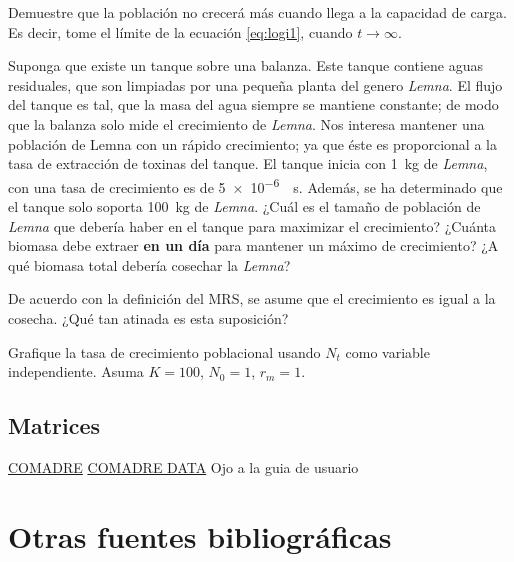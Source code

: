 \documentclass[12pt,letterpaper,]{book}
\let\BeginKnitrBlock\begin \let\EndKnitrBlock\end
\begin{document}
\BeginKnitrBlock{exercise}
\protect\hypertarget{exr:logGrowth2}{}{\label{exr:logGrowth2} }Demuestre que
la población no crecerá más cuando llega a la capacidad de carga. Es
decir, tome el límite de la ecuación \eqref{eq:logi1}, cuando
\(t \to \infty\).
\EndKnitrBlock{exercise}

\BeginKnitrBlock{exercise}
\protect\hypertarget{exr:logGrowth3}{}{\label{exr:logGrowth3} }Suponga que
existe un tanque sobre una balanza. Este tanque contiene aguas
residuales, que son limpiadas por una pequeña planta del genero
\emph{Lemna}. El flujo del tanque es tal, que la masa del agua siempre
se mantiene constante; de modo que la balanza solo mide el crecimiento
de \emph{Lemna}. Nos interesa mantener una población de Lemna con un
rápido crecimiento; ya que éste es proporcional a la tasa de extracción
de toxinas del tanque. El tanque inicia con \SI{1}{\kilogram} de
\emph{Lemna}, con una tasa de crecimiento es de \SI{5e-6}{\per\second}.
Además, se ha determinado que el tanque solo soporta \SI{100}{\kilogram}
de \emph{Lemna}. ¿Cuál es el tamaño de población de \emph{Lemna} que
debería haber en el tanque para maximizar el crecimiento? ¿Cuánta
biomasa debe extraer \textbf{en un día} para mantener un máximo de
crecimiento? ¿A qué biomasa total debería cosechar la \emph{Lemna}?
\EndKnitrBlock{exercise}

\BeginKnitrBlock{exercise}
\protect\hypertarget{exr:logGrowth4}{}{\label{exr:logGrowth4} }De acuerdo
con la definición del MRS, se asume que el crecimiento es igual a la
cosecha. ¿Qué tan atinada es esta suposición?
\EndKnitrBlock{exercise}

\BeginKnitrBlock{exercise}
\protect\hypertarget{exr:logGrowth5}{}{\label{exr:logGrowth5} }Grafique la
tasa de crecimiento poblacional usando \(N_t\) como variable
independiente. Asuma \(K=100\), \(N_0=1\), \(r_m=1\).
\EndKnitrBlock{exercise}

\subsection{Matrices}\label{matrices}

\href{http://onlinelibrary.wiley.com/doi/10.1111/1365-2656.12482/full}{COMADRE}
\href{http://www.compadre-db.org/Data/Comadre}{COMADRE DATA} Ojo a la
guia de usuario

\section{Otras fuentes
bibliográficas}\label{otras-fuentes-bibliograficas}
\end{document}
